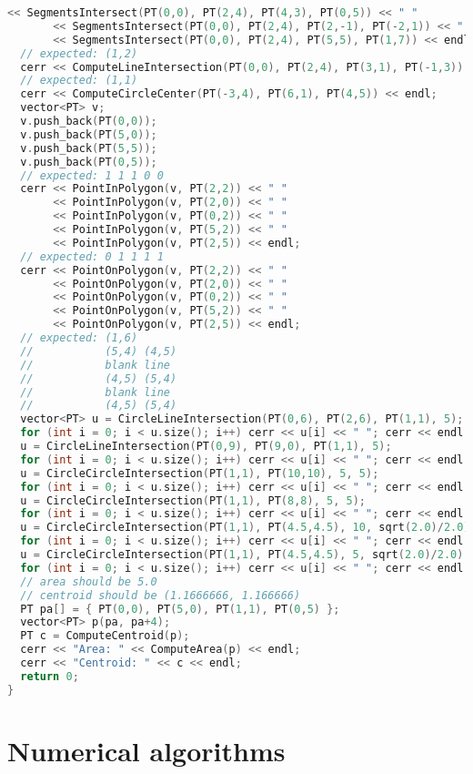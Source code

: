 \begin{lstlisting}[language=C++]
       << SegmentsIntersect(PT(0,0), PT(2,4), PT(4,3), PT(0,5)) << " "
       << SegmentsIntersect(PT(0,0), PT(2,4), PT(2,-1), PT(-2,1)) << " "
       << SegmentsIntersect(PT(0,0), PT(2,4), PT(5,5), PT(1,7)) << endl;
  // expected: (1,2)
  cerr << ComputeLineIntersection(PT(0,0), PT(2,4), PT(3,1), PT(-1,3)) << endl;
  // expected: (1,1)
  cerr << ComputeCircleCenter(PT(-3,4), PT(6,1), PT(4,5)) << endl;
  vector<PT> v; 
  v.push_back(PT(0,0));
  v.push_back(PT(5,0));
  v.push_back(PT(5,5));
  v.push_back(PT(0,5));
  // expected: 1 1 1 0 0
  cerr << PointInPolygon(v, PT(2,2)) << " "
       << PointInPolygon(v, PT(2,0)) << " "
       << PointInPolygon(v, PT(0,2)) << " "
       << PointInPolygon(v, PT(5,2)) << " "
       << PointInPolygon(v, PT(2,5)) << endl;
  // expected: 0 1 1 1 1
  cerr << PointOnPolygon(v, PT(2,2)) << " "
       << PointOnPolygon(v, PT(2,0)) << " "
       << PointOnPolygon(v, PT(0,2)) << " "
       << PointOnPolygon(v, PT(5,2)) << " "
       << PointOnPolygon(v, PT(2,5)) << endl;
  // expected: (1,6)
  //           (5,4) (4,5)
  //           blank line
  //           (4,5) (5,4)
  //           blank line
  //           (4,5) (5,4)
  vector<PT> u = CircleLineIntersection(PT(0,6), PT(2,6), PT(1,1), 5);
  for (int i = 0; i < u.size(); i++) cerr << u[i] << " "; cerr << endl;
  u = CircleLineIntersection(PT(0,9), PT(9,0), PT(1,1), 5);
  for (int i = 0; i < u.size(); i++) cerr << u[i] << " "; cerr << endl;
  u = CircleCircleIntersection(PT(1,1), PT(10,10), 5, 5);
  for (int i = 0; i < u.size(); i++) cerr << u[i] << " "; cerr << endl;
  u = CircleCircleIntersection(PT(1,1), PT(8,8), 5, 5);
  for (int i = 0; i < u.size(); i++) cerr << u[i] << " "; cerr << endl;
  u = CircleCircleIntersection(PT(1,1), PT(4.5,4.5), 10, sqrt(2.0)/2.0);
  for (int i = 0; i < u.size(); i++) cerr << u[i] << " "; cerr << endl;
  u = CircleCircleIntersection(PT(1,1), PT(4.5,4.5), 5, sqrt(2.0)/2.0);
  for (int i = 0; i < u.size(); i++) cerr << u[i] << " "; cerr << endl;
  // area should be 5.0
  // centroid should be (1.1666666, 1.166666)
  PT pa[] = { PT(0,0), PT(5,0), PT(1,1), PT(0,5) };
  vector<PT> p(pa, pa+4);
  PT c = ComputeCentroid(p);
  cerr << "Area: " << ComputeArea(p) << endl;
  cerr << "Centroid: " << c << endl;
  return 0;
}
\end{lstlisting}
\section{Numerical algorithms}

